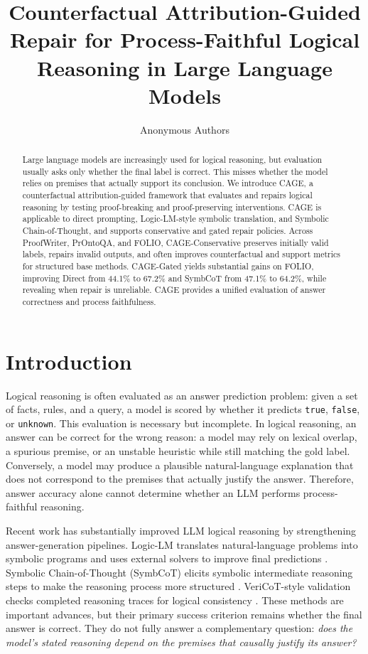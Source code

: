 \documentclass{article}
\title{Counterfactual Attribution-Guided Repair for Process-Faithful Logical Reasoning in Large Language Models}
\author{Anonymous Authors}
\begin{document}
\maketitle

\begin{abstract}
Large language models are increasingly used for logical reasoning, but evaluation usually asks only whether the final label is correct. This misses whether the model relies on premises that actually support its conclusion. We introduce CAGE, a counterfactual attribution-guided framework that evaluates and repairs logical reasoning by testing proof-breaking and proof-preserving interventions. CAGE is applicable to direct prompting, Logic-LM-style symbolic translation, and Symbolic Chain-of-Thought, and supports conservative and gated repair policies. Across ProofWriter, PrOntoQA, and FOLIO, CAGE-Conservative preserves initially valid labels, repairs invalid outputs, and often improves counterfactual and support metrics for structured base methods. CAGE-Gated yields substantial gains on FOLIO, improving Direct from 44.1\% to 67.2\% and SymbCoT from 47.1\% to 64.2\%, while revealing when repair is unreliable. CAGE provides a unified evaluation of answer correctness and process faithfulness.
\end{abstract}

\section{Introduction}

Logical reasoning is often evaluated as an answer prediction problem: given a set of facts, rules, and a query, a model is scored by whether it predicts \texttt{true}, \texttt{false}, or \texttt{unknown}. This evaluation is necessary but incomplete. In logical reasoning, an answer can be correct for the wrong reason: a model may rely on lexical overlap, a spurious premise, or an unstable heuristic while still matching the gold label. Conversely, a model may produce a plausible natural-language explanation that does not correspond to the premises that actually justify the answer. Therefore, answer accuracy alone cannot determine whether an LLM performs process-faithful reasoning.

Recent work has substantially improved LLM logical reasoning by strengthening answer-generation pipelines. Logic-LM translates natural-language problems into symbolic programs and uses external solvers to improve final predictions \cite{pan2023logiclm}. Symbolic Chain-of-Thought (SymbCoT) elicits symbolic intermediate reasoning steps to make the reasoning process more structured \cite{xu2025faithful}. VeriCoT-style validation checks completed reasoning traces for logical consistency \cite{vericot2025}. These methods are important advances, but their primary success criterion remains whether the final answer is correct. They do not fully answer a complementary question: \emph{does the model's stated reasoning depend on the premises that causally justify its answer?}
\end{document}
